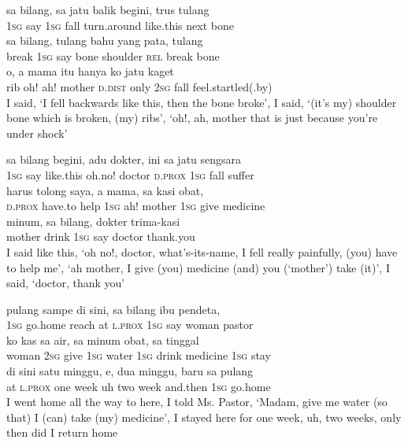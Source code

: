 \ea
\gll   sa    {bilang,}    {sa}    {jatu}    {balik}    {begini,}    {trus}   tulang\\
  \textsc{1sg}    {say}    {\textsc{1sg}}    {fall}    {turn.around}    {like.this}    {next}   bone\\
    {sa}    {bilang,}    {tulang}    {bahu}    {yang}    {pata,}    {tulang}\\
   {break}    {\textsc{1sg}}    {say}    {bone}    {shoulder}    {\textsc{rel}}    {break}    {bone}\\
    {o,}    {a}    {mama}    {itu}    {hanya}    {ko}    {jatu}    {kaget}\\
   {rib}    {oh!}    {ah!}    {mother}    {\textsc{d.dist}}    {only}    {\textsc{2sg}}    {fall}    {feel.startled(.by)}\\
\glt
I said, ‘I fell backwards like this, then the bone broke’, I said, ‘(it’s my) shoulder bone which is broken, (my) ribs’, ‘oh!, ah, mother that is just because you’re under shock’
\z

\ea
\gll   sa    {bilang}    {begini,}    {adu}    {dokter,}    {ini}    {sa}    {jatu}   sengsara\\
  \textsc{1sg}    {say}    {like.this}    {oh.no!}    {doctor}    {\textsc{d.prox}}    {\textsc{1sg}}    {fall}   suffer\\
    {harus}    {tolong}    {saya,}   a    {mama,}    {sa}    {kasi}    {obat,}\\
   {\textsc{d.prox}}    {have.to}    {help}    {\textsc{1sg}}   ah!    {mother}    {\textsc{1sg}}    {give}    {medicine}\\
    {minum,}    {sa}    {bilang,}    {dokter}    {trima-kasi}\\
   {mother}    {drink}    {\textsc{1sg}}    {say}    {doctor}    {thank.you}\\
\glt
I said like this, ‘oh no!, doctor, what’s-its-name, I fell really painfully, (you) have to help me’, ‘ah mother, I give (you) medicine (and) you (‘mother’) take (it)’, I said, ‘doctor, thank you’
\z

\ea
{}    {pulang}    {sampe}    {di}    {sini,}   sa    {bilang}    {ibu}    {pendeta,}\\
   {\textsc{1sg}}    {go.home}    {reach}    {at}    {\textsc{l.prox}}   \textsc{1sg}    {say}    {woman}    {pastor}\\
    {ko}    {kas}   sa    {air,}    {sa}    {minum}    {obat,}    {sa}   tinggal\\
   {woman}    {\textsc{2sg}}    {give}   \textsc{1sg}    {water}    {\textsc{1sg}}    {drink}    {medicine}    {\textsc{1sg}}   stay\\
\gll di    {sini}    {satu}    {minggu,}    {e,}    {dua}    {minggu,}    {baru}    {sa}    {pulang}\\
  at    {\textsc{l.prox}}    {one}    {week}    {uh}    {two}    {week}    {and.then}    {\textsc{1sg}}    {go.home}\\
\glt
I went home all the way to here, I told Ms. Pastor, ‘Madam, give me water (so that) I (can) take (my) medicine’, I stayed here for one week, uh, two weeks, only then did I return home
\z

